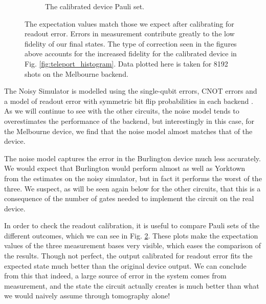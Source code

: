 \begin{figure}[h!]
\begin{subfigure}{.5\textwidth}
    \caption{The calibrated device Pauli set.}
    \label{fig:tele_pauli_dev}
  \end{subfigure}
  \caption{The expectation values match those we expect after calibrating for
readout error. Errors in measurement contribute greatly to the low fidelity of
our final states. The type of correction seen in the figures above accounts for
the increased fidelity for the calibrated device in Fig.
\ref{fig:teleport_histogram}. Data plotted here is taken for 8192 shots on the
Melbourne backend.}
  \label{fig:tele_paulis}
\end{figure}

The Noisy Simulator is modelled using the single-qubit
errors, CNOT errors and a model of readout error with symmetric bit flip
probabilities in each backend \cite{qiskit_org}. As we will continue to see with
the other circuits, the noise model tends to overestimates the performance of
the backend, but interestingly in this case, for the Melbourne device, we find
that the noise model almost matches that of the device.

The noise model captures the error in the Burlington device much less
accurately. We would expect that Burlington would perform almost as well as
Yorktown from the estimates on the noisy simulator, but in fact it performs the
worst of the three. We suspect, as will be seen again below for the other
circuits, that this is a consequence of the number of gates needed to implement
the circuit on the real device.

In order to check the readout calibration, it is useful to compare Pauli sets of
the different outcomes, which we can see in Fig. \ref{fig:tele_paulis}. These
plots make the expectation values of the three measurement bases very visible,
which eases the comparison of the results. Though not perfect, the output
calibrated for readout error fits the expected state much better than the
original device output. We can conclude from this that indeed, a large source of
error in the system comes from measurement, and the state the circuit actually
creates is much better than what we would naively assume through tomography
alone!


